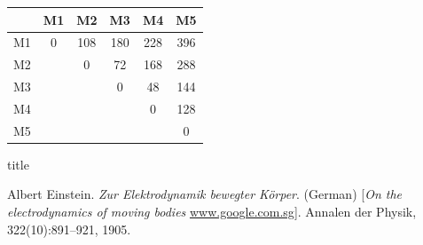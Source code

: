 \documentclass[11pt,a4paper]{article}
\theoremstyle{definition}
\begin{document}
\begin{center}
 \begin{tabular}{|| c || c | c | c |c |c ||} 
 \hline
  & M1 & M2 & M3 & M4 & M5 \\ [0.5ex] 
 \hline\hline
 M1 & 0 & 108 & 180 & 228 & 396 \\ 
 \hline
 M2 &  & 0 & 72 & 168 & 288 \\
 \hline
 M3 &  &  & 0 & 48 & 144 \\
 \hline
 M4 &  &  &  & 0 & 128 \\
 \hline
 M5 &  &  & &  & 0   \\ [0.5ex] 
 \hline
\end{tabular}
\end{center}

\begin{algorithm}
\caption{title}
\begin{algorithmic}[1]
\end{algorithmic}
\end{algorithm}

\begin{thebibliography}{9}
 
Albert Einstein. 
\textit{Zur Elektrodynamik bewegter K{\"o}rper}. (German) 
[\textit{On the electrodynamics of moving bodies} \url{www.google.com.sg}]. 
Annalen der Physik, 322(10):891–921, 1905.
\end{thebibliography}
\end{document}
